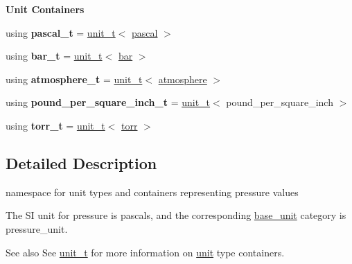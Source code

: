 \begin{Indent}{\bf Unit Containers}\par
{\em \label{namespaceunits_1_1pressure_pressureContainers}%
\hypertarget{namespaceunits_1_1pressure_pressureContainers}{}%
}\begin{DoxyCompactItemize}
\item 
\hypertarget{namespaceunits_1_1pressure_ad1cd2567af1346702f860b170271896d}{}using {\bfseries pascal\+\_\+t} = \hyperlink{classunits_1_1unit__t}{unit\+\_\+t}$<$ \hyperlink{structunits_1_1unit}{pascal} $>$\label{namespaceunits_1_1pressure_ad1cd2567af1346702f860b170271896d}

\item 
\hypertarget{namespaceunits_1_1pressure_ad346b6f7683ff274318d7c25037cc7d3}{}using {\bfseries bar\+\_\+t} = \hyperlink{classunits_1_1unit__t}{unit\+\_\+t}$<$ \hyperlink{structunits_1_1unit}{bar} $>$\label{namespaceunits_1_1pressure_ad346b6f7683ff274318d7c25037cc7d3}

\item 
\hypertarget{namespaceunits_1_1pressure_a6f66a138d1ba8b326a4147d66eeb3027}{}using {\bfseries atmosphere\+\_\+t} = \hyperlink{classunits_1_1unit__t}{unit\+\_\+t}$<$ \hyperlink{structunits_1_1unit}{atmosphere} $>$\label{namespaceunits_1_1pressure_a6f66a138d1ba8b326a4147d66eeb3027}

\item 
\hypertarget{namespaceunits_1_1pressure_a4790e93e6299b82a1bc94af1061d6daa}{}using {\bfseries pound\+\_\+per\+\_\+square\+\_\+inch\+\_\+t} = \hyperlink{classunits_1_1unit__t}{unit\+\_\+t}$<$ pound\+\_\+per\+\_\+square\+\_\+inch $>$\label{namespaceunits_1_1pressure_a4790e93e6299b82a1bc94af1061d6daa}

\item 
\hypertarget{namespaceunits_1_1pressure_a34621d01affa7d17d4d554d4328d5a1c}{}using {\bfseries torr\+\_\+t} = \hyperlink{classunits_1_1unit__t}{unit\+\_\+t}$<$ \hyperlink{structunits_1_1unit}{torr} $>$\label{namespaceunits_1_1pressure_a34621d01affa7d17d4d554d4328d5a1c}

\end{DoxyCompactItemize}
\end{Indent}


\subsection{Detailed Description}
namespace for unit types and containers representing pressure values 

The S\+I unit for pressure is {\ttfamily pascals}, and the corresponding {\ttfamily \hyperlink{structunits_1_1base__unit}{base\+\_\+unit}} category is {\ttfamily pressure\+\_\+unit}. \begin{DoxySeeAlso}{See also}
See \hyperlink{classunits_1_1unit__t}{unit\+\_\+t} for more information on \hyperlink{structunits_1_1unit}{unit} type containers. 
\end{DoxySeeAlso}

